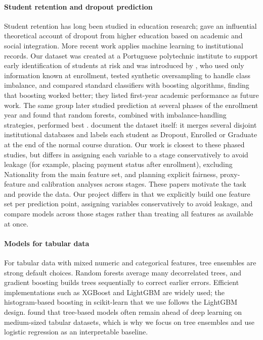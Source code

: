 \documentclass[11pt]{article}
\begin{document}
\paragraph{Student retention and dropout prediction} Student retention has long been studied in education research; \citet{tinto1975} gave an influential theoretical account of dropout from higher education based on academic and social integration. More recent work applies machine learning to institutional records. Our dataset was created at a Portuguese polytechnic institute to support early identification of students at risk and was introduced by \citet{martins2021}, who used only information known at enrollment, tested synthetic oversampling to handle class imbalance, and compared standard classifiers with boosting algorithms, finding that boosting worked better; they listed first-year academic performance as future work. The same group later studied prediction at several phases of the enrollment year and found that random forests, combined with imbalance-handling strategies, performed best \citep{martins2023}. \citet{realinho2022} document the dataset itself: it merges several disjoint institutional databases and labels each student as Dropout, Enrolled or Graduate at the end of the normal course duration. Our work is closest to these phased studies, but differs in assigning each variable to a stage conservatively to avoid leakage (for example, placing payment status after enrollment), excluding Nationality from the main feature set, and planning explicit fairness, proxy-feature and calibration analyses across stages.
These papers motivate the task and provide the data. Our project differs in that we explicitly build one feature set per prediction point, assigning variables conservatively to avoid leakage, and compare models across those stages rather than treating all features as available at once.
 
\paragraph{Models for tabular data} For tabular data with mixed numeric and categorical features, tree ensembles are strong default choices. Random forests \citep{breiman2001} average many decorrelated trees, and gradient boosting \citep{friedman2001} builds trees sequentially to correct earlier errors. Efficient implementations such as XGBoost \citep{chen2016xgboost} and LightGBM \citep{ke2017lightgbm} are widely used; the histogram-based boosting in scikit-learn that we use follows the LightGBM design. \citet{grinsztajn2022} found that tree-based models often remain ahead of deep learning on medium-sized tabular datasets, which is why we focus on tree ensembles and use logistic regression as an interpretable baseline.
 
\end{document}
